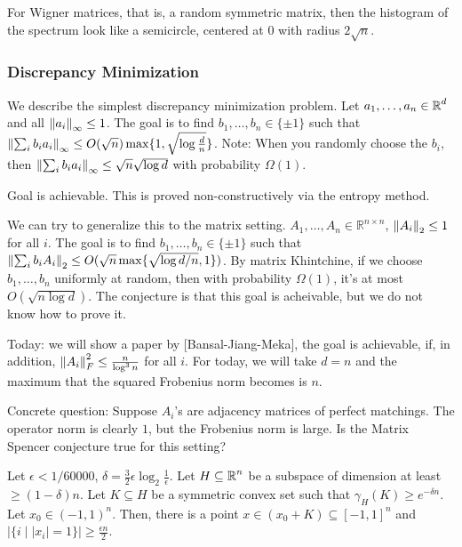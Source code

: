 For Wigner matrices, that is, a random symmetric matrix, then the histogram of the spectrum
look like a semicircle, centered at $0$ with radius $2\sqrt{n}$.

\subsubsection{Discrepancy Minimization}
We describe the simplest discrepancy minimization problem.
Let $a_1, \dots, a_n \in \operatorname{\mathbb{R}}^d$ and all $\norm{a_i}_{\infty} \le 1$.
The goal is to find $b_1, \dots, b_n \in \{\pm 1\}$ such 
that $\norm{\sum_i b_i a_i}_{\infty} \le O(\sqrt{n}) \max\{1, \sqrt{\log \frac{d}{n}}\}$.
Note: When you randomly choose the $b_i$, then $\norm{\sum_i b_i a_i}_{\infty} \le \sqrt{n} \sqrt{\log d}$
with probability $\Omega(1)$.

\begin{theorem}[Spencer, 80s]
    Goal is achievable. This is proved non-constructively via the entropy method.
\end{theorem}

We can try to generalize this to the matrix setting.
$A_1, \dots, A_n \in \mathbb{R}^{n\times n}$, $\norm{A_i}_2 \le 1$ for all $i$.
The goal is to find $b_1, \dots, b_n \in \{\pm 1\}$
such that $\norm{\sum_i b_i A_i}_2 \le O(\sqrt{n} \max\{\sqrt{\log d/n}, 1\})$.
By matrix Khintchine, if we choose $b_1, \dots, b_n$ uniformly at random, then with probability $\Omega(1)$,
it's at most $O(\sqrt{n \log d})$. The conjecture is that this goal is acheivable, but we do not know how to prove it.

Today: we will show a paper by [Bansal-Jiang-Meka], the goal is achievable, if, in addition, $\norm{A_i}_F^2 \le \frac{n}{\log^3 n}$ for all $i$.
For today, we will take $d = n$ and the maximum that the squared Frobenius norm becomes is $n$.

Concrete question: Suppose $A_i$'s are adjacency matrices of perfect matchings. The operator norm is clearly $1$,
but the Frobenius norm is large. Is the Matrix Spencer conjecture true for this setting?

\begin{lemma}
    Let $\epsilon < 1/60000$, $\delta = \frac{3}{2}\epsilon \log_2 \frac{1}{\epsilon}$.
    Let $H\subseteq \operatorname{\mathbb{R}}^n$ be a subspace of dimension at least $\ge (1 - \delta) n$.
    Let $K\subseteq H$ be a symmetric convex set such that $\gamma_H(K) \ge e^{-\delta n}$. Let
    $x_0 \in (-1, 1)^n$. Then, there is a point
    $x \in (x_0 +K) \subseteq [-1, 1]^n$ and $|\{i \mid |x_i| = 1\}| \ge \frac{\epsilon n}{2}$.
\end{lemma}


